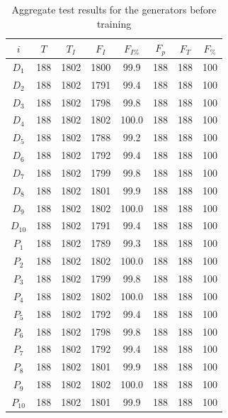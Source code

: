 \documentclass[12pt, titlepage]{report}
\theoremstyle{definition}
\begin{document}
\begin{table}
\begin{tabular}{cSSSSSSS} \toprule
    {$i$}     & {$T$} 	& {$T_I$}	& {$F_I$} 	& {$F_{I\%}$}		& {$F_p$} 	& {$F_T$} 	& {$F_{\%}$} \\ \midrule
    $D_1$  & 188   	& 1802		& 1800	 	    & 99.9				& 188	 	& 188	 	& 100 \\
    $D_2$  & 188   	& 1802 		& 1791  		& 99.4				& 188	 	& 188	 	& 100 \\
    $D_3$  & 188  	& 1802 		& 1798  		& 99.8				& 188	 	& 188	 	& 100 \\
    $D_4$  & 188   	& 1802 		& 1802  		& 100.0			    & 188  		& 188  		& 100 \\
    $D_5$  & 188   	& 1802 		& 1788   		& 99.2				& 188  		& 188  		& 100 \\
    $D_6$  & 188  	& 1802 		& 1792  		& 99.4				& 188  		& 188 		& 100 \\
    $D_7$  & 188   	& 1802 		& 1799  		& 99.8				& 188  		& 188  		& 100 \\
    $D_8$  & 188   	& 1802 		& 1801  		& 99.9				& 188  		& 188  		& 100 \\
    $D_9$  & 188   	& 1802 		& 1802  		& 100.0			    & 188  		& 188  		& 100 \\
    $D_{10}$ & 188  & 1802 		& 1791  		& 99.4				& 188  		& 188  		& 100 \\ \midrule
    $P_1$  & 188   	& 1802 		& 1789    	    & 99.3				& 188  		& 188  		& 100 \\
    $P_2$  & 188   	& 1802 		& 1802  		& 100.0			    & 188  		& 188  		& 100 \\
    $P_3$  & 188   	& 1802 		& 1799  		& 99.8				& 188  		& 188  		& 100 \\
    $P_4$  & 188   	& 1802 		& 1802  		& 100.0			    & 188  		& 188  		& 100 \\
    $P_5$  & 188   	& 1802 		& 1792   		& 99.4				& 188  		& 188  		& 100 \\
    $P_6$  & 188   	& 1802 		& 1798  		& 99.8				& 188  		& 188  		& 100 \\
    $P_7$  & 188   	& 1802 		& 1792  		& 99.4				& 188  		& 188  		& 100 \\
    $P_8$  & 188   	& 1802 		& 1801  		& 99.9				& 188  		& 188  		& 100 \\
    $P_9$  & 188   	& 1802 		& 1802  		& 100.0			    & 188  		& 188  		& 100 \\
    $P_{10}$ & 188  & 1802 		& 1801  		& 99.9				& 188  		& 188  		& 100 \\ \bottomrule
\end{tabular}

\caption{Aggregate test results for the generators before training}
\end{table}
\end{document}
